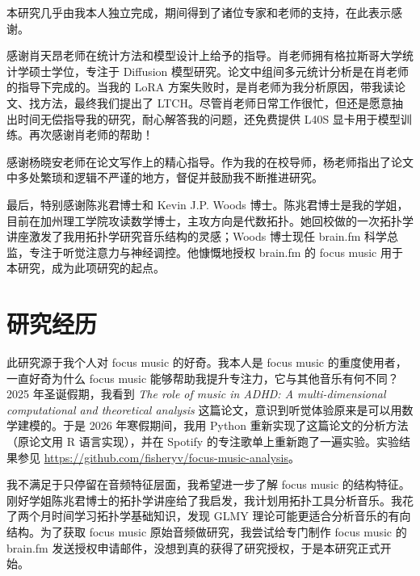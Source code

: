 \documentclass{article}
\begin{document}
本研究几乎由我本人独立完成，期间得到了诸位专家和老师的支持，在此表示感谢。

感谢肖天昂老师在统计方法和模型设计上给予的指导。肖老师拥有格拉斯哥大学统计学硕士学位，专注于 Diffusion 模型研究。论文中组间多元统计分析是在肖老师的指导下完成的。当我的 LoRA 方案失败时，是肖老师为我分析原因，带我读论文、找方法，最终我们提出了 LTCH。尽管肖老师日常工作很忙，但还是愿意抽出时间无偿指导我的研究，耐心解答我的问题，还免费提供 L40S 显卡用于模型训练。再次感谢肖老师的帮助！

感谢杨晓安老师在论文写作上的精心指导。作为我的在校导师，杨老师指出了论文中多处繁琐和逻辑不严谨的地方，督促并鼓励我不断推进研究。

最后，特别感谢陈兆君博士和 Kevin J.P. Woods 博士。陈兆君博士是我的学姐，目前在加州理工学院攻读数学博士，主攻方向是代数拓扑。她回校做的一次拓扑学讲座激发了我用拓扑学研究音乐结构的灵感；Woods 博士现任 brain.fm 科学总监，专注于听觉注意力与神经调控。他慷慨地授权 brain.fm 的 focus music 用于本研究，成为此项研究的起点。

\clearpage

\section{研究经历}

此研究源于我个人对 focus music 的好奇。我本人是 focus music 的重度使用者，一直好奇为什么 focus music 能够帮助我提升专注力，它与其他音乐有何不同？2025 年圣诞假期，我看到 \emph{The role of music in ADHD: A multi-dimensional computational and theoretical analysis} \cite{Achuthan2025} 这篇论文，意识到听觉体验原来是可以用数学建模的。于是 2026 年寒假期间，我用 Python 重新实现了这篇论文的分析方法（原论文用 R 语言实现），并在 Spotify 的专注歌单上重新跑了一遍实验。实验结果参见 \url{https://github.com/fisheryv/focus-music-analysis}。

我不满足于只停留在音频特征层面，我希望进一步了解 focus music 的结构特征。刚好学姐陈兆君博士的拓扑学讲座给了我启发，我计划用拓扑工具分析音乐。我花了两个月时间学习拓扑学基础知识，发现 GLMY 理论可能更适合分析音乐的有向结构。为了获取 focus music 原始音频做研究，我尝试给专门制作 focus music 的 brain.fm 发送授权申请邮件，没想到真的获得了研究授权，于是本研究正式开始。
\end{document}
